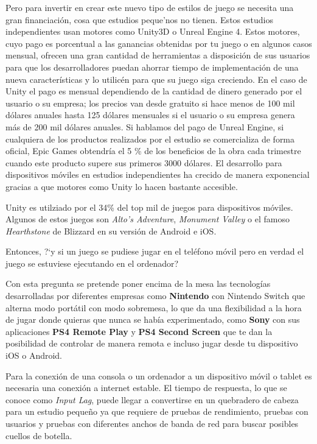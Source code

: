 Pero para invertir en crear este nuevo tipo de estilos de juego se necesita una gran financiaci\'on,
 cosa que estudios peque'nos no tienen.  Estos estudios independientes usan motores como Unity3D o Unreal Engine 4.
 Estos motores, cuyo pago es porcentual a las ganancias obtenidas por tu juego o en algunos casos mensual, ofrecen una gran cantidad de herramientas a disposici\'on 
de sus usuarios para que los desarrolladores puedan ahorrar tiempo de implementaci\'on de una nueva caracter\'isticas y lo utilic\'en para que su juego siga creciendo.
En el caso de Unity el pago es mensual dependiendo de la cantidad de dinero generado por el usuario o su empresa;
 los precios van desde gratuito si hace menos de 100 mil d\'olares anuales hasta 125 d\'olares mensuales si el usuario o su empresa genera m\'as de 200 mil d\'olares
  anuales. 
  Si hablamos del pago de Unreal Engine, si cualquiera de los productos realizados por el estudio se comercializa de forma oficial, Epic Games obtendr\'ia el 5 \% de los beneficios de la obra cada trimestre cuando este producto supere sus primeros 3000 d\'olares.
El desarrollo para dispositivos m\'oviles en estudios independientes ha crecido de manera exponencial gracias a que motores como Unity lo hacen bastante accesible. 

Unity es utilziado por el 34\% del top mil de juegos para dispositivos m\'oviles. Algunos de estos juegos son \textit{Alto's Adventure}, \textit{Monument Valley} o el famoso \textit{Hearthstone} de Blizzard en su versi\'on de Android e iOS.

Entonces,
 ?`y si un juego se pudiese jugar en el tel\'efono m\'ovil pero en verdad el juego se estuviese ejecutando en el ordenador?

Con esta pregunta se pretende poner encima de la mesa las tecnolog\'ias desarrolladas por diferentes empresas como \textbf{Nintendo} con Nintendo Switch que alterna modo port\'atil con modo sobremesa, lo que da una flexibilidad a la hora de jugar donde quieras que nunca se hab\'ia experimentado, 
como \textbf{Sony} con sus aplicaciones \textbf{PS4 Remote Play} y \textbf{PS4 Second Screen} que te dan la posibilidad de controlar de manera remota e incluso jugar desde tu dispositivo iOS o Android.

Para la conexi\'on de una consola o un ordenador a un dispositivo m\'ovil o tablet es necesaria una conexi\'on a internet estable. El tiempo de respuesta, lo que se conoce como  \textit{Input Lag}, puede llegar a convertirse en un quebradero de cabeza para un estudio peque\~no ya que requiere de pruebas de rendimiento, pruebas con usuarios y pruebas con diferentes anchos de banda de red para buscar posibles cuellos de botella. 

